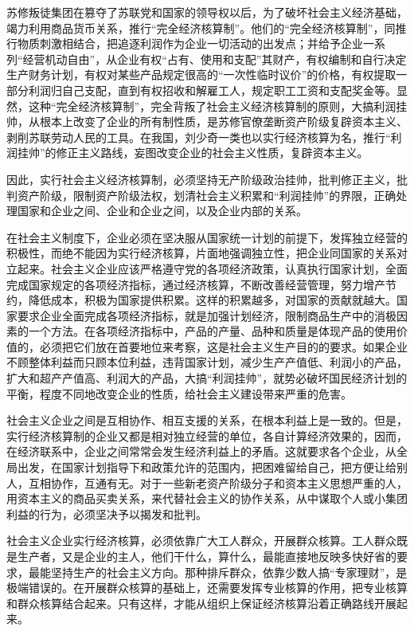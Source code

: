 \documentclass{book}
\begin{document}
苏修叛徒集团在篡夺了苏联党和国家的领导权以后，为了破坏社会主义经济基础，竭力利用商品货币关系，推行“完全经济核算制”。他们的“完全经济核算制”，同推行物质刺激相结合，把追逐利润作为企业一切活动的出发点；并给予企业一系列“经营机动自由”，从企业有权“占有、使用和支配”其财产，有权编制和自行决定生产财务计划，有权对某些产品规定很高的“一次性临时议价”的价格，有权提取一部分利润归自己支配，直到有权招收和解雇工人，规定职工工资和支配奖金等。显然，这种“完全经济核算制”，完全背叛了社会主义经济核算制的原则，大搞利润挂帅，从根本上改变了企业的所有制性质，是苏修官僚垄断资产阶级复辟资本主义、剥削苏联劳动人民的工具。在我国，刘少奇一类也以实行经济核算为名，推行“利润挂帅”的修正主义路线，妄图改变企业的社会主义性质，复辟资本主义。

因此，实行社会主义经济核算制，必须坚持无产阶级政治挂帅，批判修正主义，批判资产阶级，限制资产阶级法权，划清社会主义积累和“利润挂帅”的界限，正确处理国家和企业之间、企业和企业之间，以及企业内部的关系。

在社会主义制度下，企业必须在坚决服从国家统一计划的前提下，发挥独立经营的积极性，而绝不能因为实行经济核算，片面地强调独立性，把企业同国家的关系对立起来。社会主义企业应该严格遵守党的各项经济政策，认真执行国家计划，全面完成国家规定的各项经济指标，通过经济核算，不断改善经营管理，努力增产节约，降低成本，积极为国家提供积累。这样的积累越多，对国家的贡献就越大。国家要求企业全面完成各项经济指标，就是加强计划经济，限制商品生产中的消极因素的一个方法。在各项经济指标中，产品的产量、品种和质量是体现产品的使用价值的，必须把它们放在首要地位来考察，这是社会主义生产目的的要求。如果企业不顾整体利益而只顾本位利益，违背国家计划，减少生产产值低、利润小的产品，扩大和超产产值高、利润大的产品，大搞“利润挂帅”，就势必破坏国民经济计划的平衡，程度不同地改变企业的性质，给社会主义建设带来严重的危害。

社会主义企业之间是互相协作、相互支援的关系，在根本利益上是一致的。但是，实行经济核算制的企业又都是相对独立经营的单位，各自计算经济效果的，因而，在经济联系中，企业之间常常会发生经济利益上的矛盾。这就要求各个企业，从全局出发，在国家计划指导下和政策允许的范围内，把困难留给自己，把方便让给别人，互相协作，互通有无。对于一些新老资产阶级分子和资本主义思想严重的人，用资本主义的商品买卖关系，来代替社会主义的协作关系，从中谋取个人或小集团利益的行为，必须坚决予以揭发和批判。

社会主义企业实行经济核算，必须依靠广大工人群众，开展群众核算。工人群众既是生产者，又是企业的主人，他们干什么，算什么，最能直接地反映多快好省的要求，最能坚持生产的社会主义方向。那种排斥群众，依靠少数人搞“专家理财”，是极端错误的。在开展群众核算的基础上，还需要发挥专业核算的作用，把专业核算和群众核算结合起来。只有这样，才能从组织上保证经济核算沿着正确路线开展起来。
\end{document}
